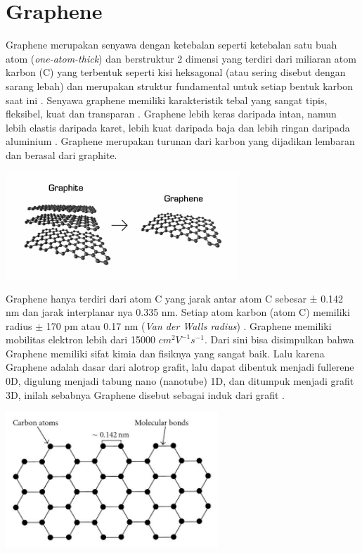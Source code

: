 \documentclass[12pt,a4paper]{report}
\begin{document}
	\section{Graphene}
	Graphene merupakan senyawa dengan ketebalan seperti ketebalan satu buah atom (\textit{one-atom-thick}) dan berstruktur 2 dimensi yang terdiri dari miliaran atom karbon (C) yang terbentuk seperti kisi heksagonal (atau sering disebut dengan sarang lebah) dan merupakan struktur fundamental untuk setiap bentuk karbon saat ini \cite{Clemons2010}\cite{Sahu2017}. Senyawa graphene memiliki karakteristik tebal yang sangat tipis, fleksibel, kuat dan transparan \cite{Ni2015}. Graphene lebih keras daripada intan, namun lebih elastis daripada karet, lebih kuat daripada baja dan lebih ringan daripada aluminium \cite{Berger2019}. Graphene merupakan turunan dari karbon yang dijadikan lembaran dan berasal dari graphite.
	
	\begin{center}
		\includegraphics[width=8.75cm]{gambar/grafit.png}
	\end{center}
	
	Graphene hanya terdiri dari atom C yang jarak antar atom C sebesar ± 0.142 nm \cite{Zhen2017} dan jarak interplanar nya 0.335 nm. Setiap atom karbon (atom C) memiliki radius $\pm$ 170 pm atau 0.17 nm (\textit{Van der Walls radius}) \cite{10.1088/2053-2563/ab35d1ch1}. Graphene memiliki mobilitas elektron lebih dari 15000 $ cm^2 V^{-1} s^{-1} $. Dari sini bisa disimpulkan bahwa Graphene memiliki sifat kimia dan fisiknya yang sangat baik. Lalu karena Graphene adalah dasar dari alotrop grafit, lalu dapat dibentuk menjadi fullerene 0D, digulung menjadi tabung nano (nanotube) 1D, dan ditumpuk menjadi grafit 3D, inilah sebabnya Graphene disebut sebagai induk dari grafit \cite{Chakraborty2018}.
		
	\begin{center}
	\includegraphics[width=8cm]{gambar/grafen.png}
	\end{center}
	
\end{document}
